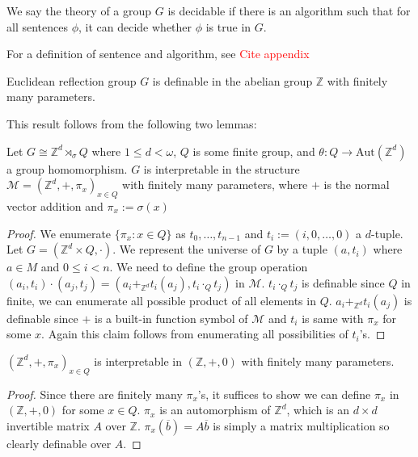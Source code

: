 \documentclass[../main.tex]{subfiles}
\begin{document}
\begin{definition}
    We say the theory of a group $G$ is decidable if there is an algorithm such that for all sentences $\phi$, it can decide whether $\phi$ is true in $G$.
\end{definition}

For a definition of sentence and algorithm, see \textcolor{red}{Cite appendix}

\begin{proposition}
\label{thm:interp}
    Euclidean reflection group $G$ is definable in the abelian group $\mathbb Z$ with finitely many parameters.
\end{proposition}

This result follows from the following two lemmas:

\begin{lemma}
    Let $G \cong \mathbb Z^d \rtimes_{\sigma} Q$ where $1\leq d < \omega$, $Q$ is some finite group, and $\theta : Q \rightarrow \text{Aut}(\mathbb Z^d)$ a group homomorphism. $G$ is interpretable in the structure $\mathcal M = (\mathbb Z^d, +, \pi_x)_{x \in Q}$ with finitely many parameters, where $+$ is the normal vector addition and $\pi_x := \sigma(x)$
\end{lemma}

\begin{proof}
    We enumerate $\{\pi_x : x\in Q\}$ as $t_0,\dots,t_{n-1}$ and $t_i := (i,0,\dots,0)$ a $d$-tuple. Let $G=(\mathbb Z^d \times Q,\cdot)$. We represent the universe of $G$ by a tuple $(a,t_i)$ where $a\in M$ and $0\leq i < n$. We need to define the group operation $(a_i,t_i)\cdot(a_j,t_j)=(a_i +_{\mathbb Z^d} t_i(a_j), t_i \cdot_Q t_j)$ in $\mathcal M$. $t_i \cdot_Q t_j$ is definable since $Q$ in finite, we can enumerate all possible product of all elements in $Q$. $a_i +_{\mathbb Z^d} t_i(a_j)$ is definable since $+$ is a built-in function symbol of $\mathcal M$ and $t_i$ is same with $\pi_x$ for some $x$. Again this claim follows from enumerating all possibilities of $t_i$'s.
\end{proof}

\begin{lemma}
    $(\mathbb Z^d, +, \pi_x)_{x \in Q}$ is interpretable in $(\mathbb Z, +, 0)$ with finitely many parameters.
\end{lemma}

\begin{proof}
    Since there are finitely many $\pi_x$'s, it suffices to show we can define $\pi_x$ in $(\mathbb Z, +, 0)$ for some $x\in Q$. $\pi_x$ is an automorphism of $\mathbb Z^d$, which is an $d\times d$ invertible matrix $A$ over $\mathbb Z$.
    $\pi_x(\overline b)=A\overline b$ is simply a matrix multiplication so clearly definable over $A$.
\end{proof}
\end{document}
